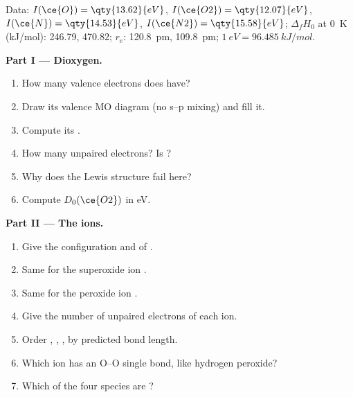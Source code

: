 \begin{problem}
\label{pb:b2:diatomic-mos:1}
Data: $I(\ce{O}) = \qty{13.62}{eV}$, $I(\ce{O2}) = \qty{12.07}{eV}$, $I(\ce{N}) =
\qty{14.53}{eV}$, $I(\ce{N2}) = \qty{15.58}{eV}$; $\Delta_f H_0$ at \qty{0}{K}
(\unit{kJ/mol}):  246.79,  470.82; $r_e$:  \qty{120.8}{pm}, 
\qty{109.8}{pm}; $1\ \unit{eV} = \qty{96.485}{kJ/mol}$.

\medskip
\noindent\textbf{Part I --- Dioxygen.}
\begin{enumerate}
  \item How many valence electrons does  have?
  \item Draw its valence MO diagram (no s--p mixing) and fill it.
  \item Compute its .
  \item How many unpaired electrons? Is  ?
  \item Why does the Lewis structure fail here?
  \item Compute $D_0(\ce{O2})$ in \unit{eV}.
\end{enumerate}

\medskip
\noindent\textbf{Part II --- The ions.}
\begin{enumerate}[resume]
  \item Give the configuration and  of .
  \item Same for the superoxide ion .
  \item Same for the peroxide ion .
  \item Give the number of unpaired electrons of each ion.
  \item Order , , ,  by predicted bond length.
  \item Which ion has an O--O single bond, like hydrogen peroxide?
  \item Which of the four species are ?
\end{enumerate}


\end{problem}
